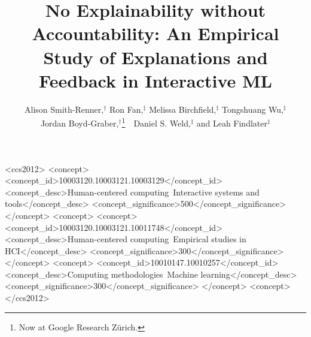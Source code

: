 \documentclass{style/sigchi}
\def\plaintitle{No Explainability without Accountability: An Empirical Study of Explanations and Feedback in Interactive ML}
\begin{document}
\title{\plaintitle}



\author{%
Alison Smith-Renner,$^\dag$ Ron Fan,$^\ddag$ Melissa Birchfield,$^\ddag$ Tongshuang Wu,$^\ddag$ \\
Jordan Boyd-Graber,$^\dag$\thanks{Now at
Google Research Z\"urich.}~~Daniel S. Weld,$^\ddag$ and Leah Findlater$^\ddag$
}


\maketitle

\begin{abstract}

\end{abstract}



\begin{CCSXML}
<ccs2012>
<concept>
<concept_id>10003120.10003121.10003129</concept_id>
<concept_desc>Human-centered computing~Interactive systems and tools</concept_desc>
<concept_significance>500</concept_significance>
</concept>
<concept>
<concept>
<concept_id>10003120.10003121.10011748</concept_id>
<concept_desc>Human-centered computing~Empirical studies in HCI</concept_desc>
<concept_significance>300</concept_significance>
</concept>
<concept>
<concept_id>10010147.10010257</concept_id>
<concept_desc>Computing methodologies~Machine learning</concept_desc>
<concept_significance>300</concept_significance>
</concept>
<concept>
</ccs2012>
\end{CCSXML}
\end{document}
